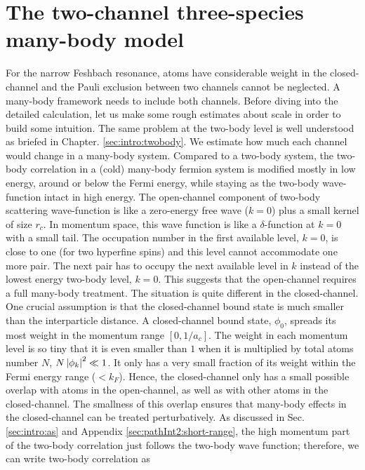 


\newcommand{\htd}{\tilde{h}}
\chapter{The two-channel three-species many-body model\label{ch:path2}}


For the narrow Feshbach resonance, atoms have considerable weight in the closed-channel and the Pauli exclusion between two channels cannot be neglected.  A many-body framework needs to include both channels.  Before diving into the detailed calculation, let us make some rough estimates about scale in order to  build some intuition.  The same problem at the two-body level is well understood as briefed in Chapter. \ref{sec:intro:twobody}.  %
We estimate how much each channel would change  in a many-body system.  Compared to a two-body system, the two-body correlation in a (cold) many-body fermion system is modified mostly in  low  energy,  around or below the Fermi energy, while staying  as  the two-body wave-function intact in high energy.  The open-channel component  of two-body scattering wave-function is like a zero-energy free wave ($k=0$) plus a small kernel of size $r_c$.  In momentum space, this wave function is like a $\delta$-function at $k=0$ with a small tail.  The occupation number in the first available level, $k=0$, is close to one (for two hyperfine spins) and this level cannot accommodate one more pair.  The next pair has to occupy the next available level in $k$ instead of the lowest energy two-body level, $k=0$.  This suggests that the open-channel requires a full many-body treatment.  The situation is quite different in the closed-channel.   One crucial assumption is that  the closed-channel bound state is much smaller than the interparticle distance. A closed-channel bound state,  $\phi_{0}$, spreads its most weight  in the  momentum range $[0,1/a_{c}]$.  The weight in each momentum level is so tiny that it is even smaller than $1$ when it is multiplied by total atoms number $N$, $N\left\lvert{\phi_{k}}\right\rvert^{2}\ll1$.             It only has a very small fraction of its weight within the Fermi energy range ($<k_{F}$).  Hence, the closed-channel only has a small possible overlap with atoms in  the open-channel, as well as with other atoms in the closed-channel.  The smallness of this overlap ensures that many-body effects in the closed-channel can be  treated perturbatively.  As discussed in Sec. \ref{sec:intro:as} and Appendix \ref{sec:pathInt2:short-range}, the high momentum part of the two-body correlation just follows the two-body wave function;  therefore, we can write two-body correlation as 
